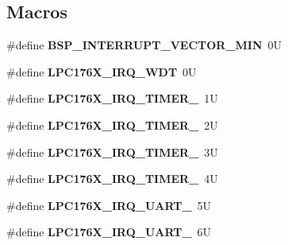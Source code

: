 \subsection*{Macros}
\begin{DoxyCompactItemize}
\item 
\mbox{\label{group__bsp__interrupt_ga64cbb02dfea4d6923abccaa0087d2a0d}} 
\#define {\bfseries B\+S\+P\+\_\+\+I\+N\+T\+E\+R\+R\+U\+P\+T\+\_\+\+V\+E\+C\+T\+O\+R\+\_\+\+M\+IN}~0U
\item 
\mbox{\label{group__bsp__interrupt_ga301a5bec9d9794ee06a4c14ae169a2f2}} 
\#define {\bfseries L\+P\+C176\+X\+\_\+\+I\+R\+Q\+\_\+\+W\+DT}~0U
\item 
\mbox{\label{group__bsp__interrupt_ga5b6476dfa91fe14c7a396a532ce1ccb5}} 
\#define {\bfseries L\+P\+C176\+X\+\_\+\+I\+R\+Q\+\_\+\+T\+I\+M\+E\+R\+\_}~1U
\item 
\mbox{\label{group__bsp__interrupt_ga7049621524128f852675cb05b590fc30}} 
\#define {\bfseries L\+P\+C176\+X\+\_\+\+I\+R\+Q\+\_\+\+T\+I\+M\+E\+R\+\_}~2U
\item 
\mbox{\label{group__bsp__interrupt_ga730d857a21aa322d21f9efab05f061fa}} 
\#define {\bfseries L\+P\+C176\+X\+\_\+\+I\+R\+Q\+\_\+\+T\+I\+M\+E\+R\+\_}~3U
\item 
\mbox{\label{group__bsp__interrupt_ga2a75be2ac040ec934a529a1815e93ff4}} 
\#define {\bfseries L\+P\+C176\+X\+\_\+\+I\+R\+Q\+\_\+\+T\+I\+M\+E\+R\+\_}~4U
\item 
\mbox{\label{group__bsp__interrupt_ga2ecac838f91ba8b5e500bc0685927c06}} 
\#define {\bfseries L\+P\+C176\+X\+\_\+\+I\+R\+Q\+\_\+\+U\+A\+R\+T\+\_}~5U
\item 
\mbox{\label{group__bsp__interrupt_gabc3b012e7152db4f62d8dde64ed84009}} 
\#define {\bfseries L\+P\+C176\+X\+\_\+\+I\+R\+Q\+\_\+\+U\+A\+R\+T\+\_}~6U
\item 
\mbox{\label{group__bsp__interrupt_gaadb626bcd294634e2f955e2efcb796d7}} 

\end{DoxyCompactItemize}
